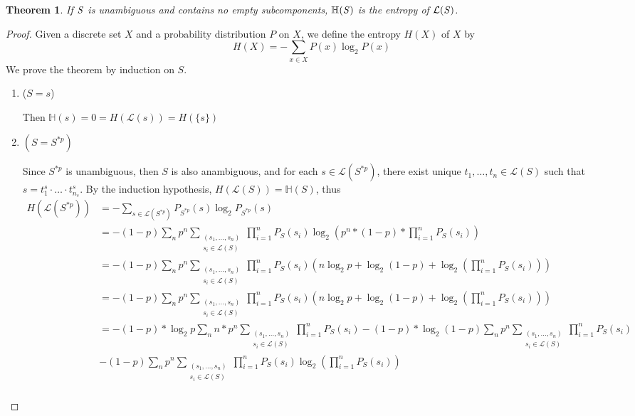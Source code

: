 \documentclass[acmsmall,screen,anonymous]{acmart}
\newtheorem*{theorem*}{Theorem}
\begin{document}
\begin{theorem*}
  \label{thm:correct_entropy}
  If $\mathit{S}$ is unambiguous and contains no empty subcomponents,
  $\mathbb{H}(\mathit{S})$ is the entropy of $\mathcal{L}(\mathit{S})$.
\end{theorem*}
\begin{proof}
Given a discrete set $X$ and a probability distribution $P$ on $X$, we define the entropy $H(X)$ of $X$ by
$$H(X) = -\sum_{x \in X}P(x)\log_2{P(x)}$$
We prove the theorem by induction on $S$.
\begin{enumerate}
\item
($S = s$)

Then $\mathbb{H}(s) = 0 = H(\mathcal{L}(s)) = H(\{s\})$
\item
$(S = S^{*p})$

Since $S^{*p}$ is unambiguous, then $S$ is also anambiguous, and for each $s \in \mathcal{L}(S^{*p})$, there exist unique $t_1, \ldots, t_n \in \mathcal{L}(S)$ such that $s = t^s_1 \cdot \ldots \cdot t^s_{n_s}$. By the induction hypothesis, $H(\mathcal{L}(S)) = \mathbb{H}(S)$, thus
\begin{align*}
H(\mathcal{L}(S^{*p})) &= - \sum_{s \in \mathcal{L}(S^{*p})} P_{S^{*p}}(s) \log_2 P_{S^{*p}}(s)\\
&= -(1-p)\sum_n p^n \sum_{\substack{(s_1, \ldots, s_n) \\ s_i \in \mathcal{L}(S)}} \prod_{i=1}^n P_S(s_i)\log_2 \left(p^n * (1 - p) * \prod_{i=1}^n P_S(s_i)\right)\\
&= -(1-p)\sum_n p^n \sum_{\substack{(s_1, \ldots, s_n) \\ s_i \in \mathcal{L}(S)}} \prod_{i=1}^n P_S(s_i)\left(n \log_2 p  + \log_2 (1 - p) + \log_2 \left(\prod_{i=1}^n P_S(s_i)\right)\right)\\
&= -(1-p)\sum_n p^n \sum_{\substack{(s_1, \ldots, s_n) \\ s_i \in \mathcal{L}(S)}} \prod_{i=1}^n P_S(s_i)\left(n \log_2 p  + \log_2 (1 - p) + \log_2 \left(\prod_{i=1}^n P_S(s_i)\right)\right)\\
&= -(1-p) * \log_2 p \sum_n n * p^n \sum_{\substack{(s_1, \ldots, s_n) \\ s_i \in \mathcal{L}(S)}} \prod_{i=1}^n P_S(s_i)
-(1-p) * \log_2 (1 - p) \sum_n p^n \sum_{\substack{(s_1, \ldots, s_n) \\ s_i \in \mathcal{L}(S)}} \prod_{i=1}^n P_S(s_i) \\
&-(1-p)\sum_n p^n \sum_{\substack{(s_1, \ldots, s_n) \\ s_i \in \mathcal{L}(S)}} \prod_{i=1}^n P_S(s_i)\log_2 \left(\prod_{i=1}^n P_S(s_i)\right)\\

\end{align*}
\end{enumerate}
\end{proof}
\end{document}
